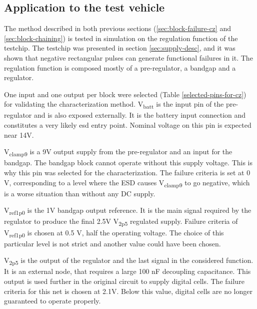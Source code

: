 \subsection{Application to the test vehicle}
\label{sec:application-test-vehicle}

The method described in both previous sections (\ref{sec:block-failure-cz} and \ref{sec:block-chaining}) is tested in simulation on the regulation function of the testchip.
The testchip was presented in section \ref{sec:supply-desc}, and it was shown that negative rectangular pulses can generate functional failures in it.
The regulation function is composed mostly of a pre-regulator, a bandgap and a regulator.


One input and one output per block were selected (Table \ref{selected-pins-for-cz}) for validating the characterization method.
V\textsubscript{batt} is the input pin of the pre-regulator and is also exposed externally.
It is the battery input connection and constitutes a very likely \gls{esd} entry point.
Nominal voltage on this pin is expected near 14V.

V\textsubscript{clamp9} is a 9V output supply from the pre-regulator and an input for the bandgap.
The bandgap block cannot operate without this supply voltage.
This is why this pin was selected for the characterization.
The failure criteria is set at 0 V, corresponding to a level where the ESD causes V\textsubscript{clamp9} to go negative, which is a worse situation than without any DC supply.

V\textsubscript{ref1p0} is the 1V bandgap output reference.
It is the main signal required by the regulator to produce the final 2.5V V\textsubscript{2p5} regulated supply.
Failure criteria of V\textsubscript{ref1p0} is chosen at 0.5 V, half the operating voltage.
The choice of this particular level is not strict and another value could have been chosen.

V\textsubscript{2p5} is the output of the regulator and the last signal in the considered function.
It is an external node, that requires a large 100 nF decoupling capacitance.
This output is used further in the original circuit to supply digital cells.
The failure criteria for this net is chosen at 2.1V.
Below this value, digital cells are no longer guaranteed to operate properly.

